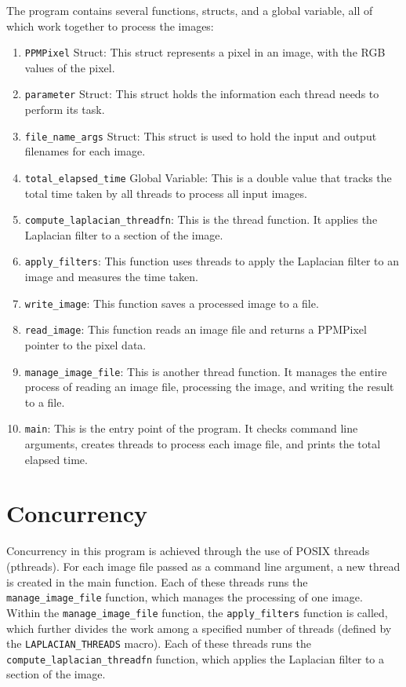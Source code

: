 \documentclass{article}
\begin{document}
The program contains several functions, structs,
and a global variable, all of which work together to process the images:
\begin{enumerate}
  \item \texttt{PPMPixel} Struct: This struct represents a pixel in an image, with the RGB values of the pixel.
  \item \texttt{parameter} Struct: This struct holds the information each thread needs to perform its task.
  \item \texttt{file\_name\_args} Struct: This struct is used to hold the input and output filenames for each image.
  \item \texttt{total\_elapsed\_time} Global Variable: This is a double value that tracks the total time taken by all threads to process all input images.
  \item \texttt{compute\_laplacian\_threadfn}: This is the thread function. It applies the Laplacian filter to a section of the image.
  \item \texttt{apply\_filters}: This function uses threads to apply the Laplacian filter to an image and measures the time taken.
  \item \texttt{write\_image}: This function saves a processed image to a file.
  \item \texttt{read\_image}: This function reads an image file and returns a PPMPixel pointer to the pixel data.
  \item \texttt{manage\_image\_file}: This is another thread function. It manages the entire process of reading an image file, processing the image, and writing the result to a file.
  \item \texttt{main}: This is the entry point of the program. It checks command line arguments, creates threads to process each image file, and prints the total elapsed time.
\end{enumerate}
\section*{Concurrency}
Concurrency in this program is achieved through the use of POSIX threads (pthreads).
For each image file passed as a command line argument,
a new thread is created in the main function.
Each of these threads runs the \texttt{manage\_image\_file} function,
which manages the processing of one image.\\

Within the \texttt{manage\_image\_file} function,
the \texttt{apply\_filters} function is called,
which further divides the work among a specified number of threads
(defined by the \texttt{LAPLACIAN\_THREADS} macro).
Each of these threads runs the \texttt{compute\_laplacian\_threadfn} function,
which applies the Laplacian filter to a section of the image.\\
\end{document}
